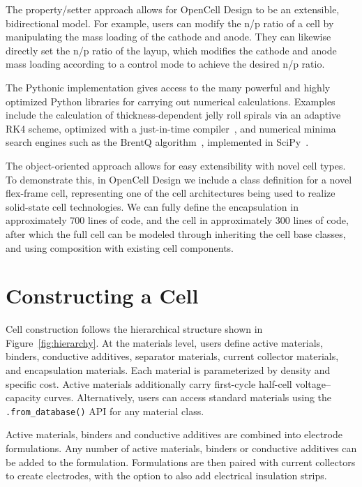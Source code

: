 \documentclass[12pt]{article}
\begin{document}
The property/setter approach allows for OpenCell Design to be an extensible, bidirectional model. For example, users can modify the n/p ratio of a cell by manipulating the mass loading of the cathode and anode. They can likewise directly set the n/p ratio of the layup, which modifies the cathode and anode mass loading according to a control mode to achieve the desired n/p ratio.

The Pythonic implementation gives access to the many powerful and highly optimized Python libraries for carrying out numerical calculations. Examples include the calculation of thickness-dependent jelly roll spirals via an adaptive RK4 scheme, optimized with a just-in-time compiler~\cite{lam2015numba}, and numerical minima search engines such as the BrentQ algorithm~\cite{brent1971algorithm}, implemented in SciPy~\cite{virtanen2020scipy}.

The object-oriented approach allows for easy extensibility with novel cell types. To demonstrate this, in OpenCell Design we include a class definition for a novel flex-frame cell, representing one of the cell architectures being used to realize solid-state cell technologies. We can fully define the encapsulation in approximately 700 lines of code, and the cell in approximately 300 lines of code, after which the full cell can be modeled through inheriting the cell base classes, and using composition with existing cell components.

\section{Constructing a Cell}

Cell construction follows the hierarchical structure shown in Figure~\ref{fig:hierarchy}. At the materials level, users define active materials, binders, conductive additives, separator materials, current collector materials, and encapsulation materials. Each material is parameterized by density and specific cost. Active materials additionally carry first-cycle half-cell voltage--capacity curves. Alternatively, users can access standard materials using the \texttt{.from\_database()} API for any material class.

Active materials, binders and conductive additives are combined into electrode formulations. Any number of active materials, binders or conductive additives can be added to the formulation. Formulations are then paired with current collectors to create electrodes, with the option to also add electrical insulation strips.
\end{document}
